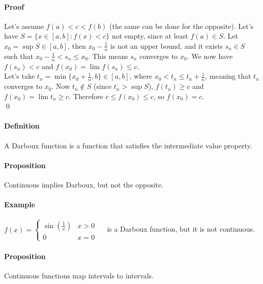 \documentclass{article}
\newcommand{\intcc}[1]{\left[#1\right]}
\newcommand{\Def}{\paragraph{Definition}}
\newcommand{\Proposition}{\paragraph{Proposition}}
\newcommand{\Proof}{\paragraph{Proof}}
\newcommand{\Example}{\paragraph{Example}}
\begin{document}
	\Proof Let's assume $f(a) < c < f(b)$ (the same can be done for the opposite).
	Let's have $S = \{ x \in \intcc{a,b} : f(x) < c \}$ not empty, since at least
	$f(a) \in S$. Let $x_0 = \sup S \in \intcc{a,b}$, then $x_0 - \frac{1}{n}$ is
	not an upper bound, and it exists $s_n \in S$ such that $x_0 - \frac{1}{n} <
	s_n \leq x_0$. This means $s_n$ converges to $x_0$. We now have $f(s_n) < c$
	and $f(x_0) = \lim f(s_n) \leq c$.
\\Let's take $t_n = \min \{ x_0 + \frac{1}{n}, b \} \in \intcc{a,b}$, where
	$x_0 < t_n \leq t_n + \frac{1}{n}$, meaning that $t_n$ converges to $x_0$. Now
	$t_n \notin S$ (since $t_n > \sup S$), $f(t_n) \geq c$ and $f(x_0) = \lim t_n
	\geq c$. Therefore $c \leq f(x_0) \leq c$, so $f(x_0) = c$.
\\\qed

	\Def A Darboux function is a function that satisfies the intermediate value
	property.

	\Proposition Continuous implies Darboux, but not the opposite.


	\Example $f(x) = \begin{cases}\sin(\frac{1}{x}) & x > 0 \\ 0 & x = 0\end{cases}
	\quad$ is a Darboux function, but it is not continuous.

	\Proposition Continuous functions map intervals to intervals.

\end{document}
